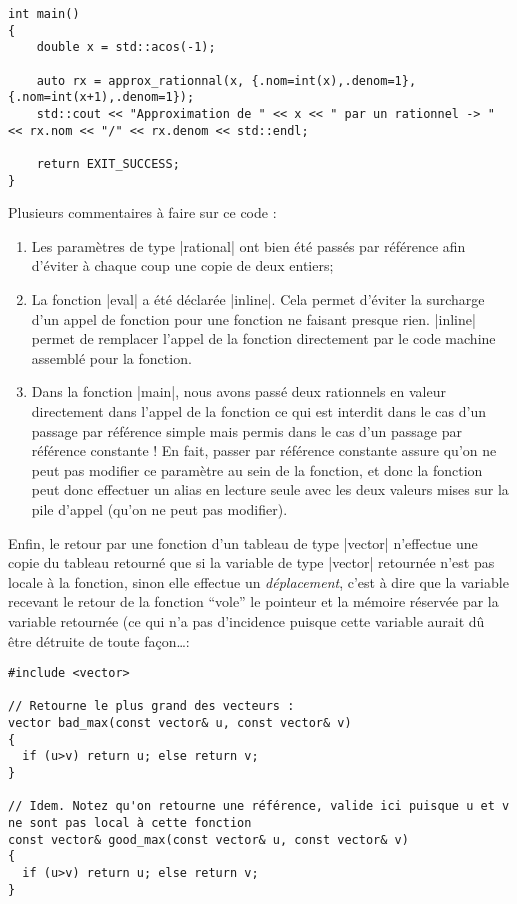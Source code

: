 \begin{itemize}
\begin{lstlisting}[caption=Exemple d'utilisation de la référence constante]
int main()
{
    double x = std::acos(-1);

    auto rx = approx_rationnal(x, {.nom=int(x),.denom=1}, {.nom=int(x+1),.denom=1});
    std::cout << "Approximation de " << x << " par un rationnel -> " << rx.nom << "/" << rx.denom << std::endl;

    return EXIT_SUCCESS;
}
\end{lstlisting}

Plusieurs commentaires à faire sur ce code :
\begin{enumerate}
    \item Les paramètres de type |rational| ont bien été passés par référence afin d'éviter à chaque coup une copie de deux entiers;
    \item La fonction |eval| a été déclarée |inline|. Cela permet d'éviter la surcharge d'un appel de fonction pour une fonction ne faisant presque rien. |inline| permet de remplacer l'appel de la fonction directement par le code machine assemblé pour la fonction. 
    \item Dans la fonction |main|, nous avons passé deux rationnels en valeur directement dans l'appel de la fonction ce qui est interdit dans le cas d'un passage par référence simple mais permis dans le cas d'un passage par référence constante ! En fait, passer par référence constante assure qu'on ne peut pas modifier ce paramètre au sein de la fonction, et donc la fonction peut donc effectuer un alias en lecture seule avec les deux valeurs mises sur la pile d'appel (qu'on ne peut pas modifier).
\end{enumerate}

Enfin, le retour par une fonction d'un tableau de type |vector| n'effectue une copie du tableau retourné
que si la variable de type |vector| retournée n'est pas locale à la fonction, sinon
elle effectue un \textsl{déplacement}, c'est à dire que la variable recevant le retour de la fonction ``vole'' le pointeur et la mémoire réservée par la variable retournée (ce qui n'a pas d'incidence puisque cette variable aurait dû être détruite de toute façon\ldots :

\begin{lstlisting}[caption=retour d'une variable de type vector]
#include <vector>

// Retourne le plus grand des vecteurs :
vector bad_max(const vector& u, const vector& v)
{
  if (u>v) return u; else return v;
}

// Idem. Notez qu'on retourne une référence, valide ici puisque u et v ne sont pas local à cette fonction
const vector& good_max(const vector& u, const vector& v)
{
  if (u>v) return u; else return v;
}



\end{lstlisting}
\end{itemize}
